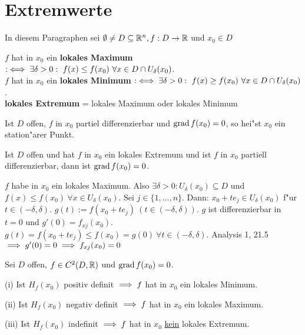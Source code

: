\documentclass[a4paper,twoside,DIV15,BCOR12mm]{scrbook}
\begin{document}
\chapter{Extremwerte}
\def\grad{\mathop{\rm grad}\nolimits}

\begin{vereinbarung}
In diesem Paragraphen sei $\emptyset\ne D \subseteq\mathbb{R}^n, f:D\to\mathbb{R}$ und $x_0\in D$
\end{vereinbarung}

\begin{definition*}
\begin{liste}
\item
$f$ hat in $x_0$ ein \textbf{lokales Maximum} $:\iff \exists \delta>0:\ f(x)\le f(x_0)\ \forall x\in D \cap U_\delta(x_0)$.\\
$f$ hat in $x_0$ ein \textbf{lokales Minimum} $:\iff \exists \delta>0:\ f(x)\ge f(x_0)\ \forall x\in D \cap U_\delta(x_0)$.\\
\textbf{lokales Extremum} = lokales Maximum oder lokales Minimum
\item Ist $D$ offen, $f$ in $x_0$ partiel differenzierbar und $\grad f(x_0)=0$, so hei"st $x_0$ ein station"arer Punkt.
\end{liste}
\end{definition*}

\begin{satz}
Ist $D$ offen und hat $f$ in $x_0$ ein lokales Extremum und ist $f$ in $x_0$ partiell differenzierbar, dann ist $\grad f(x_0)=0$.
\end{satz}

\begin{beweis}
$f$ habe in $x_0$ ein lokales Maximum. Also $\exists \delta>0: U_\delta(x_0)\subseteq D$ und $f(x)\le f(x_0)\ \forall x\in U_\delta(x_0)$. Sei $j \in \{1,\ldots,n\}$. Dann: $x_0 + te_j \in U_\delta(x_0)$ f"ur $t\in (-\delta, \delta)$. $g(t):=f(x_0 + te_j)\ (t\in (-\delta, \delta))$. $g$ ist differenzierbar in $t=0$ und $g'(0)=f_{xj}(x_0)$. $g(t)=f(x_0+te_j)\le f(x_0)=g(0)\ \forall t\in(-\delta,\delta)$. Analysis 1, 21.5 $\implies g'(0)=0\implies f_{xj}(x_0)=0$
\end{beweis}

\begin{satz}
Sei $D$ offen, $f\in C^2(D,\mathbb{R})$ und $\grad f(x_0)=0$.
\begin{liste}
\item[(i)]
Ist $H_f(x_0)$ positiv definit $\implies f$ hat in $x_0$ ein lokales Minimum.
\item[(ii)]
Ist $H_f(x_0)$ negativ definit $\implies f$ hat in $x_0$ ein lokales Maximum.
\item[(iii)]
Ist $H_f(x_0)$ indefinit $\implies f$ hat in $x_0$ \underline{kein} lokales Extremum.
\end{liste}
\end{satz}
\end{document}
